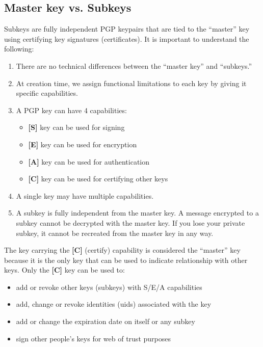 \documentclass[a4paper,8pt,english]{sphinxmanual}
\begin{document}
\subsection{Master key vs. Subkeys}
\label{process/maintainer-pgp-guide:master-key-vs-subkeys}
Subkeys are fully independent PGP keypairs that are tied to the ``master''
key using certifying key signatures (certificates). It is important to
understand the following:
\begin{enumerate}
\item {} 
There are no technical differences between the ``master key'' and ``subkeys.''

\item {} 
At creation time, we assign functional limitations to each key by
giving it specific capabilities.

\item {} 
A PGP key can have 4 capabilities:
\begin{itemize}
\item {} 
\textbf{{[}S{]}} key can be used for signing

\item {} 
\textbf{{[}E{]}} key can be used for encryption

\item {} 
\textbf{{[}A{]}} key can be used for authentication

\item {} 
\textbf{{[}C{]}} key can be used for certifying other keys

\end{itemize}

\item {} 
A single key may have multiple capabilities.

\item {} 
A subkey is fully independent from the master key. A message
encrypted to a subkey cannot be decrypted with the master key. If you
lose your private subkey, it cannot be recreated from the master key
in any way.

\end{enumerate}

The key carrying the \textbf{{[}C{]}} (certify) capability is considered the
``master'' key because it is the only key that can be used to indicate
relationship with other keys. Only the \textbf{{[}C{]}} key can be used to:
\begin{itemize}
\item {} 
add or revoke other keys (subkeys) with S/E/A capabilities

\item {} 
add, change or revoke identities (uids) associated with the key

\item {} 
add or change the expiration date on itself or any subkey

\item {} 
sign other people's keys for web of trust purposes

\end{itemize}
\end{document}
